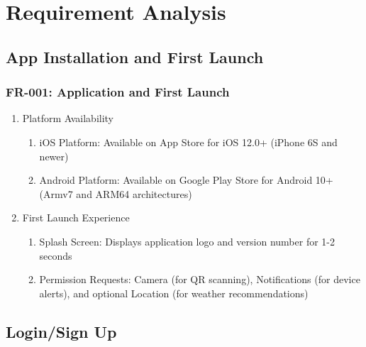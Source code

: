 \documentclass[conference]{IEEEtran}
\begin{document}
\section{Requirement Analysis}
    \subsection{\textbf{App Installation and First Launch}}
        \subsubsection{FR-001: Application and First Launch}

            \begin{enumerate}
                \item Platform Availability
                    \begin{enumerate}
                        \item iOS Platform: Available on App Store for iOS 12.0+ (iPhone 6S and newer)
                        \item Android Platform: Available on Google Play Store for Android 10+ (Armv7 and ARM64 architectures)
                    \end{enumerate}
                \item First Launch Experience
                    \begin{enumerate}
                        \item Splash Screen: Displays application logo and version number for 1-2 seconds
                        \item Permission Requests: Camera (for QR scanning), Notifications (for device alerts), and optional Location (for weather recommendations)
                    \end{enumerate}
            \end{enumerate}

    \subsection{\textbf{Login/Sign Up}}
\end{document}
